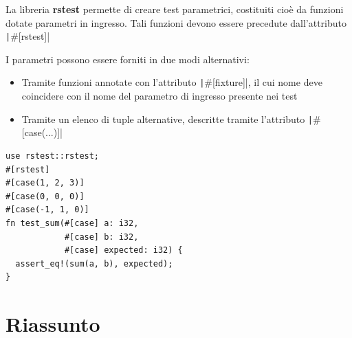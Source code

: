 La libreria \textbf{rstest} permette di creare test parametrici, costituiti cioè
da funzioni dotate parametri in ingresso. Tali funzioni devono essere precedute
dall'attributo \texttt|#[rstest]|

I parametri possono essere forniti in due modi alternativi:

\begin{itemize}
  \item Tramite funzioni annotate con l'attributo \texttt|#[fixture]|,
        il cui nome deve coincidere con il nome del parametro di ingresso presente nei test
  \item Tramite un elenco di tuple alternative, descritte tramite l'attributo \texttt|#[case(...)]|
\end{itemize}



\begin{verbatim}
use rstest::rstest;
#[rstest]
#[case(1, 2, 3)]
#[case(0, 0, 0)]
#[case(-1, 1, 0)]
fn test_sum(#[case] a: i32,
            #[case] b: i32,
            #[case] expected: i32) {
  assert_eq!(sum(a, b), expected);
}
\end{verbatim}


\section{Riassunto}

